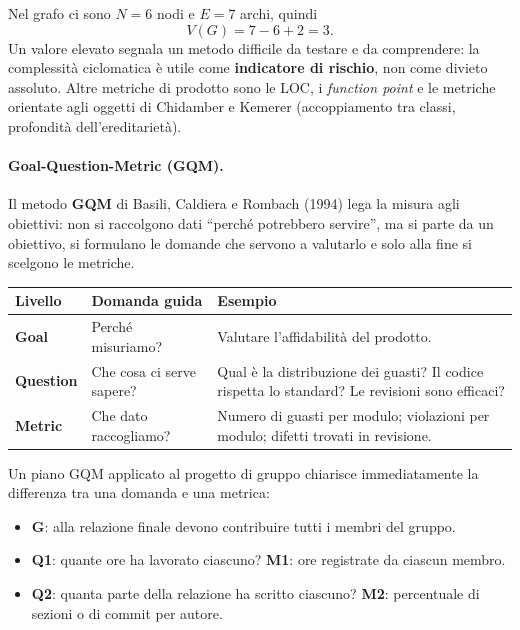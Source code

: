\documentclass[12pt]{extarticle}
\begin{document}
\noindent Nel grafo ci sono $N=6$ nodi e $E=7$ archi, quindi
\[
V(G) = 7 - 6 + 2 = 3.
\]
Un valore elevato segnala un metodo difficile da testare e da comprendere: la complessità ciclomatica è utile come \textbf{indicatore di rischio}, non come divieto assoluto. Altre metriche di prodotto sono le LOC, i \textit{function point} e le metriche orientate agli oggetti di Chidamber e Kemerer (accoppiamento tra classi, profondità dell'ereditarietà).

\paragraph{Goal-Question-Metric (GQM).}
Il metodo \textbf{GQM} di Basili, Caldiera e Rombach (1994) lega la misura agli obiettivi: non si raccolgono dati ``perché potrebbero servire'', ma si parte da un obiettivo, si formulano le domande che servono a valutarlo e solo alla fine si scelgono le metriche.

\begin{center}
\small
\begin{tabular}{p{2.4cm}p{5.4cm}p{8.0cm}}
    \toprule
    \textbf{Livello} & \textbf{Domanda guida} & \textbf{Esempio} \\
    \midrule
    \textbf{Goal} & Perché misuriamo? & Valutare l'affidabilità del prodotto. \\
    \addlinespace
    \textbf{Question} & Che cosa ci serve sapere? & Qual è la distribuzione dei guasti? Il codice rispetta lo standard? Le revisioni sono efficaci? \\
    \addlinespace
    \textbf{Metric} & Che dato raccogliamo? & Numero di guasti per modulo; violazioni per modulo; difetti trovati in revisione. \\
    \bottomrule
\end{tabular}
\end{center}

\noindent Un piano GQM applicato al progetto di gruppo chiarisce immediatamente la differenza tra una domanda e una metrica:

\begin{itemize}
    \item \textbf{G}: alla relazione finale devono contribuire tutti i membri del gruppo.
    \item \textbf{Q1}: quante ore ha lavorato ciascuno? \quad \textbf{M1}: ore registrate da ciascun membro.
    \item \textbf{Q2}: quanta parte della relazione ha scritto ciascuno? \quad \textbf{M2}: percentuale di sezioni o di commit per autore.
\end{itemize}
\end{document}
